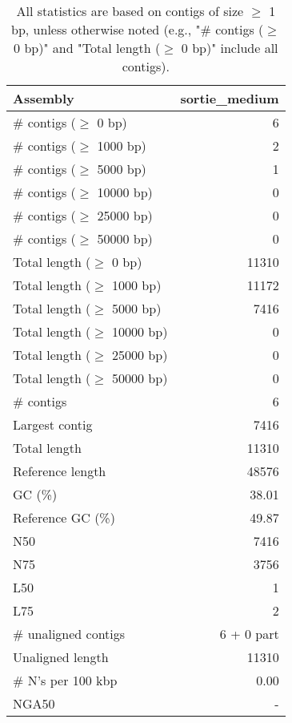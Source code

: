 \documentclass[12pt,a4paper]{article}
\begin{document}
\begin{table}[ht]
\begin{center}
\caption{All statistics are based on contigs of size $\geq$ 1 bp, unless otherwise noted (e.g., "\# contigs ($\geq$ 0 bp)" and "Total length ($\geq$ 0 bp)" include all contigs).}
\begin{tabular}{|l*{1}{|r}|}
\hline
Assembly & sortie\_medium \\ \hline
\# contigs ($\geq$ 0 bp) & 6 \\ \hline
\# contigs ($\geq$ 1000 bp) & 2 \\ \hline
\# contigs ($\geq$ 5000 bp) & 1 \\ \hline
\# contigs ($\geq$ 10000 bp) & 0 \\ \hline
\# contigs ($\geq$ 25000 bp) & 0 \\ \hline
\# contigs ($\geq$ 50000 bp) & 0 \\ \hline
Total length ($\geq$ 0 bp) & 11310 \\ \hline
Total length ($\geq$ 1000 bp) & 11172 \\ \hline
Total length ($\geq$ 5000 bp) & 7416 \\ \hline
Total length ($\geq$ 10000 bp) & 0 \\ \hline
Total length ($\geq$ 25000 bp) & 0 \\ \hline
Total length ($\geq$ 50000 bp) & 0 \\ \hline
\# contigs & 6 \\ \hline
Largest contig & 7416 \\ \hline
Total length & 11310 \\ \hline
Reference length & 48576 \\ \hline
GC (\%) & 38.01 \\ \hline
Reference GC (\%) & 49.87 \\ \hline
N50 & 7416 \\ \hline
N75 & 3756 \\ \hline
L50 & 1 \\ \hline
L75 & 2 \\ \hline
\# unaligned contigs & 6 + 0 part \\ \hline
Unaligned length & 11310 \\ \hline
\# N's per 100 kbp & 0.00 \\ \hline
NGA50 & - \\ \hline
\end{tabular}
\end{center}
\end{table}
\end{document}
